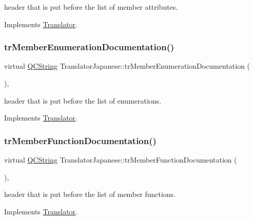 header that is put before the list of member attributes. 

Implements \mbox{\hyperlink{class_translator}{Translator}}.

\mbox{\label{class_translator_japanese_ac678de2e9035626add9a498001597c94}} 
\subsubsection{\texorpdfstring{trMemberEnumerationDocumentation()}{trMemberEnumerationDocumentation()}}
{\footnotesize\ttfamily virtual \mbox{\hyperlink{class_q_c_string}{Q\+C\+String}} Translator\+Japanese\+::tr\+Member\+Enumeration\+Documentation (\begin{DoxyParamCaption}{ }\end{DoxyParamCaption})\hspace{0.3cm}{\ttfamily [inline]}, {\ttfamily [virtual]}}

header that is put before the list of enumerations. 

Implements \mbox{\hyperlink{class_translator}{Translator}}.

\mbox{\label{class_translator_japanese_a8290eb235b1ac9997bbf1bc086ef9f45}} 
\subsubsection{\texorpdfstring{trMemberFunctionDocumentation()}{trMemberFunctionDocumentation()}}
{\footnotesize\ttfamily virtual \mbox{\hyperlink{class_q_c_string}{Q\+C\+String}} Translator\+Japanese\+::tr\+Member\+Function\+Documentation (\begin{DoxyParamCaption}{ }\end{DoxyParamCaption})\hspace{0.3cm}{\ttfamily [inline]}, {\ttfamily [virtual]}}

header that is put before the list of member functions. 

Implements \mbox{\hyperlink{class_translator}{Translator}}.

